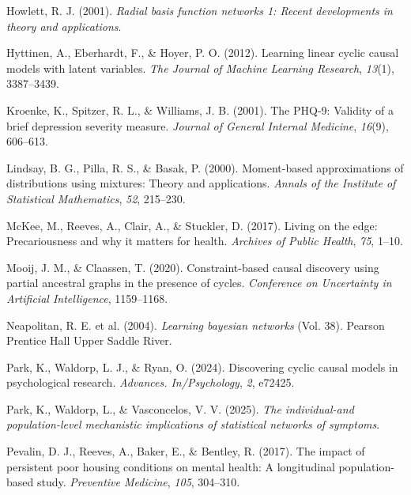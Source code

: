 \documentclass[
]{article}
\newlength{\cslhangindent}
\newenvironment{CSLReferences}[2] %
 {\begin{list}{}{%
  \setlength{\itemindent}{0pt}
  \setlength{\leftmargin}{0pt}
  \setlength{\parsep}{0pt}
  \ifodd #1
   \setlength{\leftmargin}{\cslhangindent}
   \setlength{\itemindent}{-1\cslhangindent}
  \fi
  \setlength{\itemsep}{#2\baselineskip}}}
 {\end{list}}
\begin{document}
\begin{CSLReferences}{1}{0}
Howlett, R. J. (2001). \emph{Radial basis function networks 1: Recent
developments in theory and applications}.

Hyttinen, A., Eberhardt, F., \& Hoyer, P. O. (2012). Learning linear
cyclic causal models with latent variables. \emph{The Journal of Machine
Learning Research}, \emph{13}(1), 3387--3439.

Kroenke, K., Spitzer, R. L., \& Williams, J. B. (2001). The PHQ-9:
Validity of a brief depression severity measure. \emph{Journal of
General Internal Medicine}, \emph{16}(9), 606--613.

Lindsay, B. G., Pilla, R. S., \& Basak, P. (2000). Moment-based
approximations of distributions using mixtures: Theory and applications.
\emph{Annals of the Institute of Statistical Mathematics}, \emph{52},
215--230.

McKee, M., Reeves, A., Clair, A., \& Stuckler, D. (2017). Living on the
edge: Precariousness and why it matters for health. \emph{Archives of
Public Health}, \emph{75}, 1--10.

Mooij, J. M., \& Claassen, T. (2020). Constraint-based causal discovery
using partial ancestral graphs in the presence of cycles.
\emph{Conference on Uncertainty in Artificial Intelligence}, 1159--1168.

Neapolitan, R. E. et al. (2004). \emph{Learning bayesian networks} (Vol.
38). Pearson Prentice Hall Upper Saddle River.

Park, K., Waldorp, L. J., \& Ryan, O. (2024). Discovering cyclic causal
models in psychological research. \emph{Advances. In/Psychology},
\emph{2}, e72425.

Park, K., Waldorp, L., \& Vasconcelos, V. V. (2025). \emph{The
individual-and population-level mechanistic implications of statistical
networks of symptoms}.

Pevalin, D. J., Reeves, A., Baker, E., \& Bentley, R. (2017). The impact
of persistent poor housing conditions on mental health: A longitudinal
population-based study. \emph{Preventive Medicine}, \emph{105},
304--310.


\end{CSLReferences}
\end{document}
